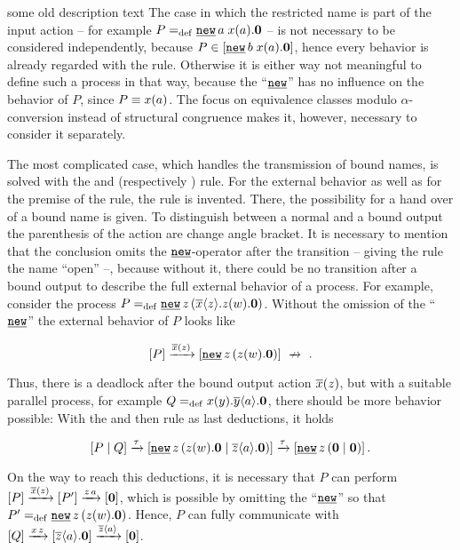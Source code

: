 \begin{old}{some old description text}
The case in which the restricted name is part of the input action -- for example $P\define\procres{a}{\inp{x}{a}.\proczero}$ -- is not necessary to be considered independently, because $P\in\ec{\procres{b}{\inp{x}{a}.\proczero}}$, hence every behavior is already regarded with the \eres{} rule. Otherwise it is either way not meaningful to define such a process in that way, because the ``$\procres{}{}$'' has no influence on the behavior of $P$, since $P\equiv x(a)$. The focus on equivalence classes modulo $\alpha$-conversion instead of structural congruence makes it, however, necessary to consider it separately.

The most complicated case, which handles the transmission of bound names, is solved with the \eopen{} and \eclosel{} (respectively \ecloser{}) rule. For the external behavior as well as for the premise of the \eclosel{} rule, the \eopen{} rule is invented. There, the possibility for a hand over of a bound name is given. To distinguish between a normal and a bound output the parenthesis of the action are change angle bracket. It is necessary to mention that the conclusion omits the $\procres{}{}$-operator after the transition -- giving the rule the name ``open'' --, because without it, there could be no transition after a bound output to describe the full external behavior of a process. For example, consider the process $P\define \procres[klammer]{z}{\out{x}{z}.\inp{z}{w}.\proczero}$. Without the omission  of the ``$\procres{}{}$'' the external behavior of $P$ looks like

\[\ec{P}\bouttrans{x}{z}\ec{\procres[a]{z}{\inp{z}{w}.\proczero}}\nxrightarrow{}.\]

Thus, there is a deadlock after the bound output action $\overline{x}(z)$, but with a suitable parallel process, for example $Q=_{\mathrm{def}}x(y).\overline{y}\langle a\rangle.\mathbf{0}$, there should be more behavior possible: With the \eclosel{} and then \ecomr{} rule as last deductions, it holds

\[\ec{\procpar{P}{Q}}\tautrans\ec{\procres[a]{z}{\procpar{\inp{z}{w}.\proczero}{\out{z}{a}.\proczero}}}\tautrans\ec{\procres[a]{z}{\procpar{\proczero}{\proczero}}}.\]

On the way to reach this deductions, it is necessary that $P$ can perform $\left[P\right]\xrightarrow{\overline{x}(z)}\left[P'\right]\xrightarrow{z\,a}\left[\mathbf{0}\right]$, which is possible by omitting the ``$\procres{}{}$'' so that $P'\define\procres[a]{z}{\inp{z}{w}.\proczero}$. Hence, $P$ can fully communicate with $\left[Q\right]\xrightarrow{x\,z}\left[\overline{z}\langle a\rangle.\mathbf{0}\right]\xrightarrow{\overline{z}\langle a\rangle}\left[\mathbf{0}\right]$.


\end{old}

